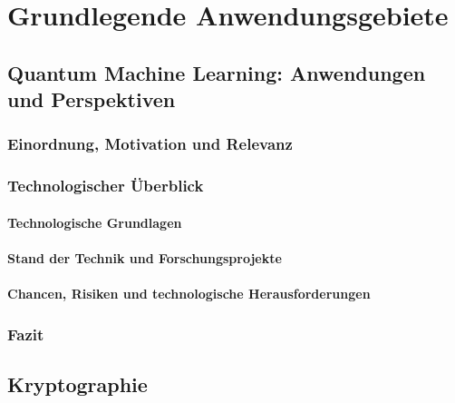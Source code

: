 \chapter{Grundlegende Anwendungsgebiete}
\label{trends} %



\section{Quantum Machine Learning: Anwendungen und Perspektiven}
\subsection{Einordnung, Motivation und Relevanz}
\subsection{Technologischer Überblick}
\subsubsection{Technologische Grundlagen}
\subsubsection{Stand der Technik und Forschungsprojekte}
\subsubsection{Chancen, Risiken und technologische Herausforderungen}
\subsection{Fazit}

\vspace{2em}

\section{Kryptographie}

